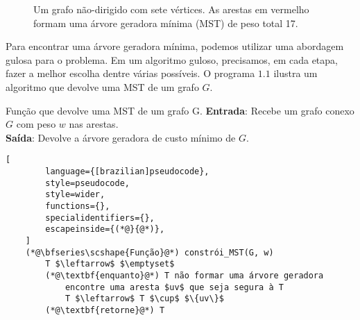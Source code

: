 \begin{figure}
    \centering
    \caption{Um grafo não-dirigido com sete vértices. As arestas em vermelho formam uma árvore geradora mínima (MST) de peso total 17.}
    \label{fig:mst_example}
\end{figure}

Para encontrar uma árvore geradora mínima, podemos utilizar uma abordagem gulosa para o problema. Em um algoritmo guloso, precisamos, em cada etapa, fazer a melhor escolha dentre várias possíveis. O programa $1.1$ ilustra um algoritmo que devolve uma MST de um grafo $G$. 

\begin{programruledcaption}{Função que devolve uma MST de um grafo G.\label{prog:busca}}
    \noindent\textbf{Entrada}: Recebe um grafo conexo $G$ com peso $w$ nas arestas.\\
    \textbf{Saída}: Devolve a árvore geradora de custo mínimo de $G$.
    \vspace{-0.5\baselineskip}
    \begin{lstlisting}[
        language={[brazilian]pseudocode},
        style=pseudocode,
        style=wider,
        functions={},
        specialidentifiers={},
        escapeinside={(*@}{@*)},
    ]
    (*@\bfseries\scshape{Função}@*) constrói_MST(G, w)
        T $\leftarrow$ $\emptyset$
        (*@\textbf{enquanto}@*) T não formar uma árvore geradora
            encontre uma aresta $uv$ que seja segura à T
            T $\leftarrow$ T $\cup$ $\{uv\}$
        (*@\textbf{retorne}@*) T
    \end{lstlisting}
    \vspace{-0.5\baselineskip}
\end{programruledcaption}

